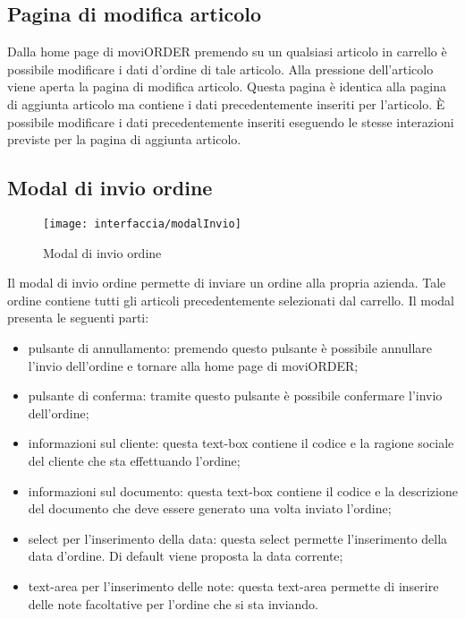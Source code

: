 \subsection{Pagina di modifica articolo}

Dalla home page di moviORDER premendo su un qualsiasi articolo in carrello è possibile modificare i dati d'ordine di tale articolo. Alla pressione dell'articolo viene aperta la pagina di modifica articolo. Questa pagina è identica alla pagina di aggiunta articolo ma contiene i dati precedentemente inseriti per l'articolo. È possibile modificare i dati precedentemente inseriti eseguendo le stesse interazioni previste per la pagina di aggiunta articolo.

\subsection{Modal di invio ordine}

\begin{figure}[!h] 
    \centering 
    \texttt{[image: interfaccia/modalInvio]} 
    \caption{Modal di invio ordine}
\end{figure}

Il modal di invio ordine permette di inviare un ordine alla propria azienda. Tale ordine contiene tutti gli articoli precedentemente selezionati dal carrello. Il modal presenta le seguenti parti:
\begin{itemize}
	\item pulsante di annullamento: premendo questo pulsante è possibile annullare l'invio dell'ordine e tornare alla home page di moviORDER;
	\item pulsante di conferma: tramite questo pulsante è possibile confermare l'invio dell'ordine;
	\item informazioni sul cliente: questa text-box contiene il codice e la ragione sociale del cliente che sta effettuando l'ordine;
	\item informazioni sul documento: questa text-box contiene il codice e la descrizione del documento che deve essere generato una volta inviato l'ordine;
	\item select per l'inserimento della data: questa select permette l'inserimento della data d'ordine. Di default viene proposta la data corrente;
	\item text-area per l'inserimento delle note: questa text-area permette di inserire delle note facoltative per l'ordine che si sta inviando.
\end{itemize}

